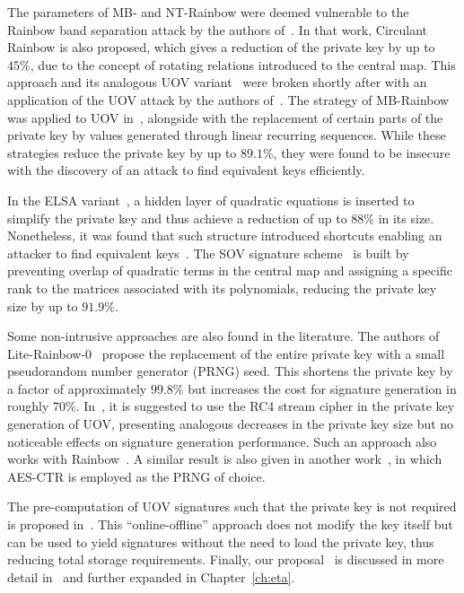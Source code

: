 \documentclass[12pt, a4paper, oneside]{memoir}
\theoremstyle{definition}
\begin{document}
The parameters of MB- and NT-Rainbow were deemed vulnerable to the Rainbow band separation attack by the authors of~\cite{Peng:201706}. In that work, Circulant Rainbow is also proposed, which gives a reduction of the private key by up to $45\%$, due to the concept of rotating relations introduced to the central map. This approach and its analogous UOV variant~\cite{Peng:201803} were broken shortly after with an application of the UOV attack by the authors of~\cite{Hashimoto:201903}. The strategy of MB-Rainbow was applied to UOV in~\cite{Tan:201511}, alongside with the replacement of certain parts of the private key by values generated through linear recurring sequences. While these strategies reduce the private key by up to $89.1\%$, they were found to be insecure~\cite{Park:201803} with the discovery of an attack to find equivalent keys efficiently. 

In the ELSA variant~\cite{Shim:201712}, a hidden layer of quadratic equations is inserted to simplify the private key and thus achieve a reduction of up to $88\%$ in its size. Nonetheless, it was found that such structure introduced shortcuts enabling an attacker to find equivalent keys~\cite{Hashimoto:201909}. The SOV signature scheme~\cite{Shim:202001} is built by preventing overlap of quadratic terms in the central map and assigning a specific rank to the matrices associated with its polynomials, reducing the private key size by up to $91.9\%$.

Some non-intrusive approaches are also found in the literature. The authors of Lite-Rainbow-0~\cite{Shim:201512} propose the replacement of the entire private key with a small pseudorandom number generator (PRNG) seed. This shortens the private key by a factor of approximately $99.8\%$ but increases the cost for signature generation in roughly $70\%$. In~\cite{Borges:201209}, it is suggested to use the RC4 stream cipher in the private key generation of UOV, presenting analogous decreases in the private key size but no noticeable effects on signature generation performance. Such an approach also works with Rainbow~\cite{Dornelles:201910}. A similar result is also given in another work~\cite{Seo:201403}, in which AES-CTR is employed as the PRNG of choice.

The pre-computation of UOV signatures such that the private key is not required is proposed in~\cite{Chen:201603}. This ``online-offline'' approach does not modify the key itself but can be used to yield signatures without the need to load the private key, thus reducing total storage requirements. Finally, our proposal~\cite{Zambonin:201907} is discussed in more detail in~\cite{Bittencourt:201911} and further expanded in Chapter~\ref{ch:eta}.
\end{document}
